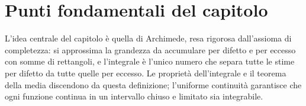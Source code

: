 \section{Punti fondamentali del capitolo}
\label{sec:sintesi-cap08}

L'idea centrale del capitolo è quella di Archimede, resa rigorosa dall'assioma di
completezza: si approssima la grandezza da accumulare per difetto e per eccesso con
somme di rettangoli, e l'integrale è l'unico numero che separa tutte le stime per
difetto da tutte quelle per eccesso. Le proprietà dell'integrale e il teorema della
media discendono da questa definizione; l'uniforme continuità garantisce che ogni
funzione continua in un intervallo chiuso e limitato sia integrabile.

